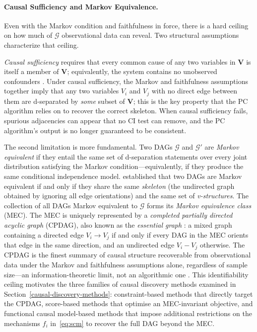 \paragraph{Causal Sufficiency and Markov Equivalence.}
Even with the Markov condition and faithfulness in force, there is a
hard ceiling on how much of $\mathcal{G}$ observational data can reveal.
Two structural assumptions characterize that ceiling.

\emph{Causal sufficiency} requires that every common cause of any two
variables in $\mathbf{V}$ is itself a member of $\mathbf{V}$;
equivalently, the system contains no unobserved confounders
\cite{Spirtes2001CausationPA, Peters2017ElementsOC}.
Under causal sufficiency, the Markov and faithfulness assumptions
together imply that any two variables $V_i$ and $V_j$ with no
direct edge between them are d-separated by \emph{some} subset of
$\mathbf{V}$; this is the key property that the PC algorithm relies on
to recover the correct skeleton.
When causal sufficiency fails, spurious adjacencies can appear that no
CI test can remove, and the PC algorithm's output is no longer
guaranteed to be consistent.

The second limitation is more fundamental.
Two DAGs $\mathcal{G}$ and $\mathcal{G}'$ are \emph{Markov equivalent}
if they entail the same set of d-separation statements over every
joint distribution satisfying the Markov condition---equivalently, if
they produce the same conditional independence model.
\textcite{Verma1990EquivalenceAS} established that two DAGs are Markov
equivalent if and only if they share the same \emph{skeleton}
(the undirected graph obtained by ignoring all edge orientations)
and the same set of \emph{v-structures}.
The collection of all DAGs Markov equivalent to $\mathcal{G}$ forms
its \emph{Markov equivalence class} (MEC).
The MEC is uniquely represented by a \emph{completed partially directed
acyclic graph} (CPDAG), also known as the \emph{essential graph}
\cite{Andersson1997ACO}: a mixed graph containing a directed edge
$V_i \to V_j$ if and only if every DAG in the MEC orients that edge
in the same direction, and an undirected edge $V_i - V_j$ otherwise.
The CPDAG is the finest summary of causal structure recoverable from
observational data under the Markov and faithfulness assumptions alone,
regardless of sample size---an information-theoretic limit, not an
algorithmic one \cite{Verma1990EquivalenceAS, Peters2017ElementsOC}.
This identifiability ceiling motivates the three families of causal
discovery methods examined in Section~\ref{causal-discovery-methods}:
constraint-based methods that directly target the CPDAG, score-based
methods that optimise an MEC-invariant objective, and functional causal
model-based methods that impose additional restrictions on the mechanisms
$f_i$ in~\eqref{eq:scm} to recover the full DAG beyond the MEC.

